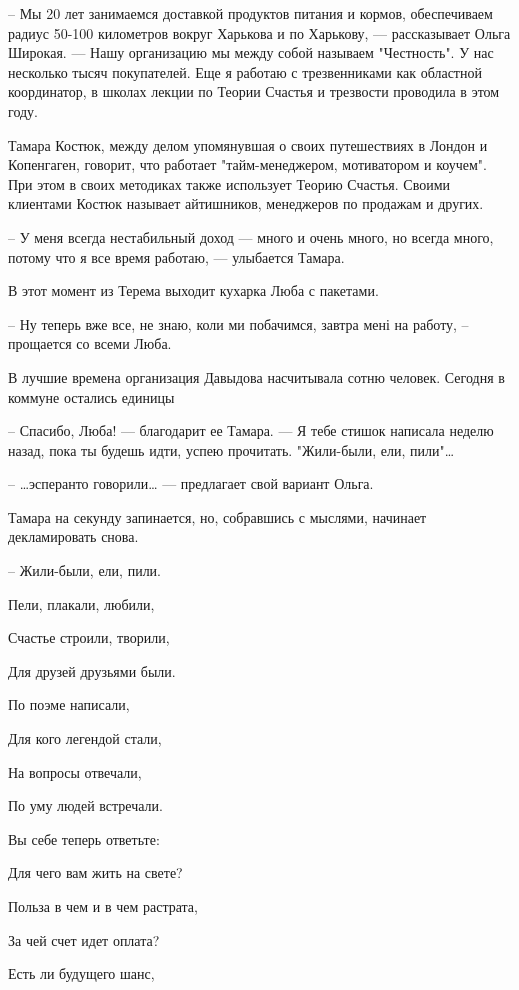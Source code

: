 – Мы 20 лет занимаемся доставкой продуктов питания и кормов, обеспечиваем
радиус 50-100 километров вокруг Харькова и по Харькову, --- рассказывает Ольга
Широкая. --- Нашу организацию мы между собой называем "Честность". У нас
несколько тысяч покупателей. Еще я работаю с трезвенниками как областной
координатор, в школах лекции по Теории Счастья и трезвости проводила в этом
году.

Тамара Костюк, между делом упомянувшая о своих путешествиях в Лондон и
Копенгаген, говорит, что работает "тайм-менеджером, мотиватором и коучем". При
этом в своих методиках также использует Теорию Счастья. Своими клиентами Костюк
называет айтишников, менеджеров по продажам и других.

– У меня всегда нестабильный доход --- много и очень много, но всегда много,
потому что я все время работаю, --- улыбается Тамара.

В этот момент из Терема выходит кухарка Люба с пакетами.

– Ну теперь вже все, не знаю, коли ми побачимся, завтра мені на работу, –
прощается со всеми Люба.



В лучшие времена организация Давыдова насчитывала сотню человек. Сегодня в коммуне остались единицы

– Спасибо, Люба! --- благодарит ее Тамара. --- Я тебе стишок написала неделю назад, пока ты будешь идти, успею прочитать. "Жили-были, ели, пили"…

– …эсперанто говорили… --- предлагает свой вариант Ольга.

Тамара на секунду запинается, но, собравшись с мыслями, начинает декламировать снова.

– Жили-были, ели, пили.

Пели, плакали, любили,

Счастье строили, творили,

Для друзей друзьями были.

По поэме написали,

Для кого легендой стали,

На вопросы отвечали,

По уму людей встречали.

Вы себе теперь ответьте:

Для чего вам жить на свете?

Польза в чем и в чем растрата,

За чей счет идет оплата?

Есть ли будущего шанс,

